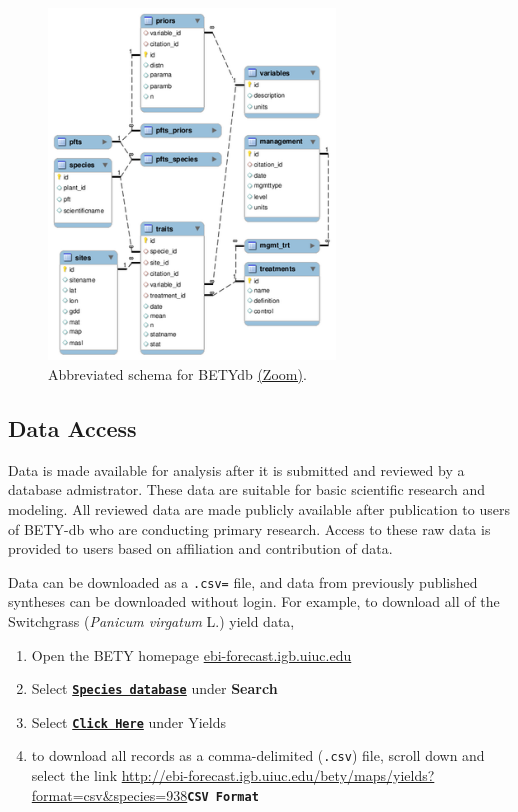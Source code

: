 \documentclass[10pt]{article}
\begin{document}
\begin{centering}
  \begin{figure}[!hbt]
    \includegraphics[width=3in]{summarymodel.png}
    \caption{Abbreviated schema for BETYdb \href{http://www.openwetware.org/images/d/d4/Summary_model20100713.jpg}{(Zoom)}.}
    \label{fig:summarymodel}
  \end{figure}
\end{centering}



\subsection{Data Access}\label{sec:download}
 Data is made available for analysis after it is submitted and reviewed by a database admistrator. 
 These data are suitable for basic scientific research and modeling. 
 All  reviewed data are made publicly available after publication to users of BETY-db who are conducting primary research.  
 Access to these raw data is provided to users based on affiliation and contribution of data.

 Data can be downloaded as a \verb+.csv=+ file, and data from previously published syntheses can be downloaded without login. 
 For example, to download all of the Switchgrass (\emph{Panicum virgatum} L.) yield data, 

\begin{enumerate}
\item Open the BETY homepage \href{ebi-forecast.igb.uiuc.edu/bety}{ebi-forecast.igb.uiuc.edu}
\item Select \href{http://ebi-forecast.igb.uiuc.edu/bety/maps/species_details}{\textbf{\texttt{Species database}}} under \textbf{Search}
\item Select \href{http://ebi-forecast.igb.uiuc.edu/bety/maps/yields?species=938}{\textbf{\texttt{Click Here}}} under Yields
\item to download all records as a comma-delimited (\verb+.csv+) file, scroll down and select the link \url{http://ebi-forecast.igb.uiuc.edu/bety/maps/yields?format=csv\&species=938}{\textbf{\texttt{CSV Format}} }
\end{enumerate}
\end{document}
